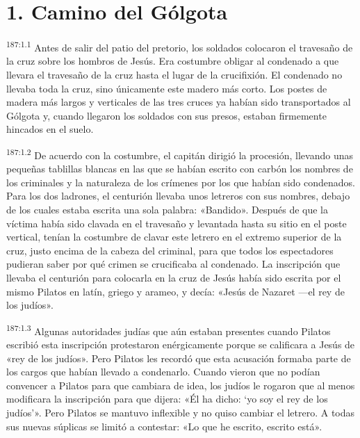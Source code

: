 \section*{1. Camino del Gólgota}
\par 
\textsuperscript{187:1.1} Antes de salir del patio del pretorio, los soldados colocaron el travesaño de la cruz sobre los hombros de Jesús. Era costumbre obligar al condenado a que llevara el travesaño de la cruz hasta el lugar de la crucifixión. El condenado no llevaba toda la cruz, sino únicamente este madero más corto. Los postes de madera más largos y verticales de las tres cruces ya habían sido transportados al Gólgota y, cuando llegaron los soldados con sus presos, estaban firmemente hincados en el suelo.

\par 
\textsuperscript{187:1.2} De acuerdo con la costumbre, el capitán dirigió la procesión, llevando unas pequeñas tablillas blancas en las que se habían escrito con carbón los nombres de los criminales y la naturaleza de los crímenes por los que habían sido condenados. Para los dos ladrones, el centurión llevaba unos letreros con sus nombres, debajo de los cuales estaba escrita una sola palabra: «Bandido». Después de que la víctima había sido clavada en el travesaño y levantada hasta su sitio en el poste vertical, tenían la costumbre de clavar este letrero en el extremo superior de la cruz, justo encima de la cabeza del criminal, para que todos los espectadores pudieran saber por qué crimen se crucificaba al condenado. La inscripción que llevaba el centurión para colocarla en la cruz de Jesús había sido escrita por el mismo Pilatos en latín, griego y arameo, y decía: «Jesús de Nazaret ---el rey de los judíos».

\par 
\textsuperscript{187:1.3} Algunas autoridades judías que aún estaban presentes cuando Pilatos escribió esta inscripción protestaron enérgicamente porque se calificara a Jesús de «rey de los judíos». Pero Pilatos les recordó que esta acusación formaba parte de los cargos que habían llevado a condenarlo. Cuando vieron que no podían convencer a Pilatos para que cambiara de idea, los judíos le rogaron que al menos modificara la inscripción para que dijera: «Él ha dicho: `yo soy el rey de los judíos'». Pero Pilatos se mantuvo inflexible y no quiso cambiar el letrero. A todas sus nuevas súplicas se limitó a contestar: «Lo que he escrito, escrito está».

